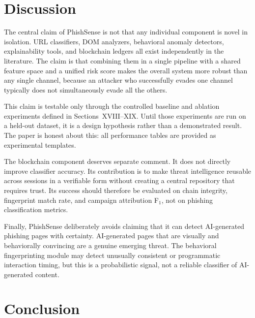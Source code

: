 \documentclass[conference]{IEEEtran}
\begin{document}
\section{Discussion}

The central claim of PhishSense is not that any individual component is novel in isolation.
URL classifiers, DOM analyzers, behavioral anomaly detectors, explainability tools, and blockchain
ledgers all exist independently in the literature.
The claim is that combining them in a single pipeline with a shared feature space and a unified
risk score makes the overall system more robust than any single channel, because an attacker who
successfully evades one channel typically does not simultaneously evade all the others.

This claim is testable only through the controlled baseline and ablation experiments defined in
Sections~XVIII--XIX.
Until those experiments are run on a held-out dataset, it is a design hypothesis rather than a
demonstrated result.
The paper is honest about this: all performance tables are provided as experimental templates.

The blockchain component deserves separate comment.
It does not directly improve classifier accuracy.
Its contribution is to make threat intelligence reusable across sessions in a verifiable form
without creating a central repository that requires trust.
Its success should therefore be evaluated on chain integrity, fingerprint match rate, and
campaign attribution F$_1$, not on phishing classification metrics.

Finally, PhishSense deliberately avoids claiming that it can detect AI-generated phishing pages
with certainty.
AI-generated pages that are visually and behaviorally convincing are a genuine emerging threat.
The behavioral fingerprinting module may detect unusually consistent or programmatic interaction
timing, but this is a probabilistic signal, not a reliable classifier of AI-generated content.

\section{Conclusion}
\end{document}
